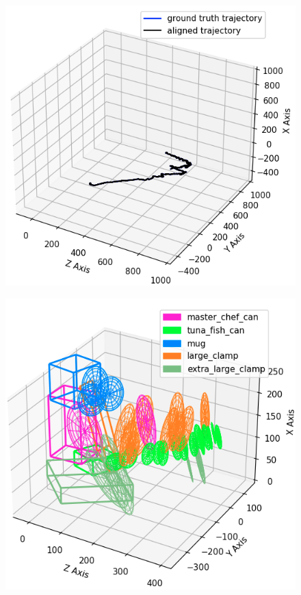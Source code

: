 \documentclass[report.tex]{subfiles}
\begin{document}
\begin{itemize}
\begin{figure}[H]
\centering
\begin{minipage}{.45\textwidth}
  \centering
  \includegraphics[width=\textwidth]{Images/48_iter_traj.png}
  \label{fig:iterative_traj_48}
\end{minipage}%
\begin{minipage}{.45\textwidth}
  \centering
  \includegraphics[width=\textwidth]{Images/48_iter_quads.png}

\end{minipage}
\end{figure}
\end{itemize}
\end{document}
